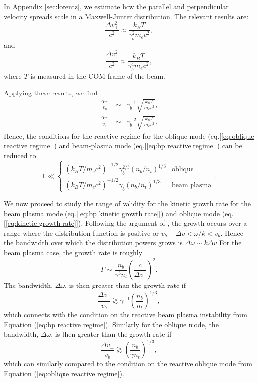 \documentclass[usenatbib,iop,apj,numberedappendix]{aeb_emulateapj_2015}
\begin{document}
In Appendix \ref{sec:lorentz}, we estimate how the parallel and perpendicular velocity spreads scale in a Maxwell-Junter distribution.  The relevant results are: 
\begin{equation}
\frac{\Delta v_{\perp}^2}{c^2} \approx \frac {k_B T}{\gamma_b^2 m_e c^2 },
\end{equation}
and 
\begin{equation}
\frac{\Delta v_{\parallel}^2}{c^2} \approx \frac {k_B T}{\gamma_b^4 m_e c^2 },
\end{equation}
where $T$ is measured in the COM frame of the beam.  

Applying these results, we find
\begin{eqnarray}
\frac{\Delta v_{\perp}}{v_b} &\sim&  \gamma_b^{-1}\sqrt{\frac{k_BT}{m_ec^2}},\\
\frac{\Delta v_{\parallel}}{v_b} &\sim& \gamma_b^{-2}\sqrt{\frac{k_BT}{m_ec^2}}.
\end{eqnarray}
Hence, the conditions for the reactive regime for the oblique mode (eq.[\ref{eq:oblique reactive regime}]) and beam-plasma mode (eq.[\ref{eq:bp reactive regime}]) can be reduced to 
\begin{equation}\label{eq:generic reactive regime}
 \displaystyle
1 \ll \left\{
 \begin{array}{cl}
 ({k_BT}/{m_ec^2})^{-1/2}\gamma_b^{2/3}\left({n_b}/{n_t}\right)^{1/3} & \textrm{oblique} \\
({k_BT}/{m_ec^2})^{-1/2}\gamma_b\left({n_b}/{n_t}\right)^{1/3} & \textrm{beam plasma} 
\end{array}
\right..
\end{equation}

We now proceed to study the range of validity for the kinetic growth rate for the beam plasma mode (eq.[\ref{eq:bp kinetic growth rate}]) and oblique mode (eq.[\ref{eq:kinetic growth rate}]).  Following the argument of \cite{Boyd}, the growth occurs over a range where the distribution function is positive or $v_b - \Delta v < \omega/k < v_b$.  Hence the bandwidth over which the distribution powers grows is $\Delta \omega \sim k \Delta v$  For the beam plasma case, the growth rate is roughly
\begin{equation}
 \Gamma \sim \frac{n_b}{\gamma^3n_t} \left(\frac{c}{\Delta v_{\parallel}}\right)^{2}.
\end{equation}
The bandwidth, $\Delta \omega$, is then greater than the growth rate if 
\begin{equation}\label{eq:bp kinetic regime}
 \frac{\Delta v_{\parallel}}{v_b} \gtrsim \gamma^{-1}\left(\frac{n_b}{n_t}\right)^{1/3},
\end{equation}
which connects with the condition on the reactive beam plasma instability from Equation (\ref{eq:bp reactive regime}).
Similarly for the oblique mode, the bandwidth, $\Delta \omega$, is then greater than the growth rate if 
\begin{equation}\label{eq:oblique kinetic regime}
\frac{\Delta v_{\perp}}{v_b} \gtrsim \left(\frac{n_b}{\gamma n_t}\right)^{1/3},
\end{equation}
which can similarly compared to the condition on the reactive oblique mode from Equation (\ref{eq:oblique reactive regime}).
\end{document}
